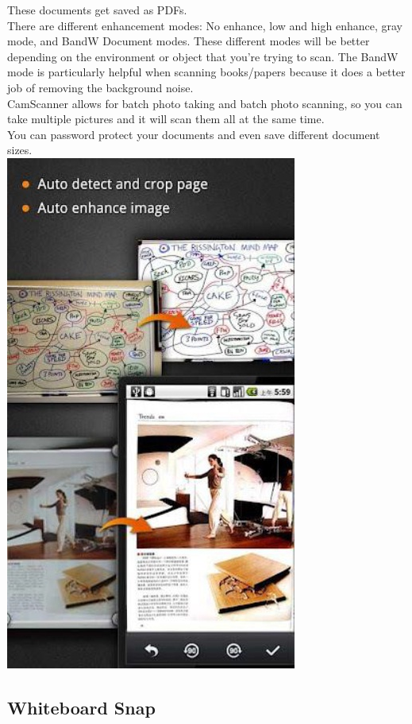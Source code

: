 \documentclass[]{article}
\begin{document}
			These documents get saved as PDFs.\\
			
			There are different enhancement modes: No enhance, low and high enhance, gray mode, and BandW Document modes. These different modes will be better depending on the environment or object that you’re trying to scan. The BandW mode is particularly helpful when scanning books/papers because it does a better job of removing the background noise. \\
			
			CamScanner allows for batch photo taking and batch photo scanning, so you can take multiple pictures and it will scan them all at the same time.\\
			
			You can password protect your documents and even save different document sizes.\\
			\includegraphics{images/autoCrop.jpg}	

		\subsection{Whiteboard Snap}
		
\end{document}
